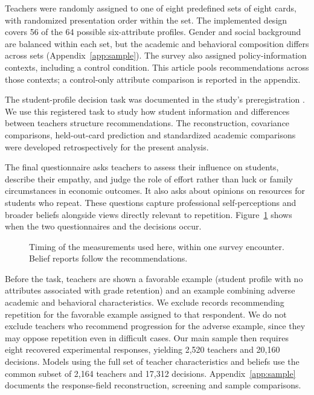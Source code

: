 Teachers were randomly assigned to one of eight predefined sets of eight cards, with randomized presentation order within the set. The implemented design covers 56 of the 64 possible six-attribute profiles. Gender and social background are balanced within each set, but the academic and behavioral composition differs across sets (Appendix~\ref{app:sample}). The survey also assigned policy-information contexts, including a control condition. This article pools recommendations across those contexts; a control-only attribute comparison is reported in the appendix.

The student-profile decision task was documented in the study's preregistration \citep{registry}. We use this registered task to study how student information and differences between teachers structure recommendations. The reconstruction, covariance comparisons, held-out-card prediction and standardized academic comparisons were developed retrospectively for the present analysis.

The final questionnaire asks teachers to assess their influence on students, describe their empathy, and judge the role of effort rather than luck or family circumstances in economic outcomes. It also asks about opinions on resources for students who repeat. These questions capture professional self-perceptions and broader beliefs alongside views directly relevant to repetition. Figure~\ref{fig:timeline} shows when the two questionnaires and the decisions occur.

\begin{figure}[!htbp]\centering\color{reused}
\caption{Timing of the measurements used here, within one survey encounter. Belief reports follow the recommendations.}\label{fig:timeline}
\end{figure}
Before the task, teachers are shown a favorable example (student profile with no attributes associated with grade retention) and an example combining adverse academic and behavioral characteristics. We exclude records recommending repetition for the favorable example assigned to that respondent. We do not exclude teachers who recommend progression for the adverse example, since they may oppose repetition even in difficult cases. Our main sample then requires eight recovered experimental responses, yielding 2,520 teachers and 20,160 decisions. Models using the full set of teacher characteristics and beliefs use the common subset of 2,164 teachers and 17,312 decisions. Appendix~\ref{app:sample} documents the response-field reconstruction, screening and sample comparisons.

